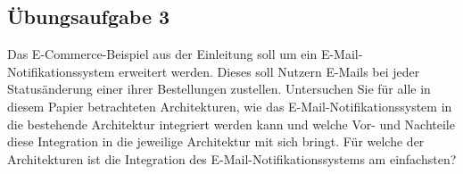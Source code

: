 \documentclass[acmtog]{acmart}
\begin{document}
\subsection{Übungsaufgabe 3}
Das E-Commerce-Beispiel aus der Einleitung soll um ein E-Mail-Notifikationssystem erweitert werden.
Dieses soll Nutzern E-Mails bei jeder Statusänderung einer ihrer Bestellungen zustellen.
Untersuchen Sie für alle in diesem Papier betrachteten Architekturen, wie das E-Mail-Notifikationssystem in die bestehende Architektur integriert werden kann
und welche Vor- und Nachteile diese Integration in die jeweilige Architektur mit sich bringt.
Für welche der Architekturen ist die Integration des E-Mail-Notifikationssystems am einfachsten?
\end{document}
